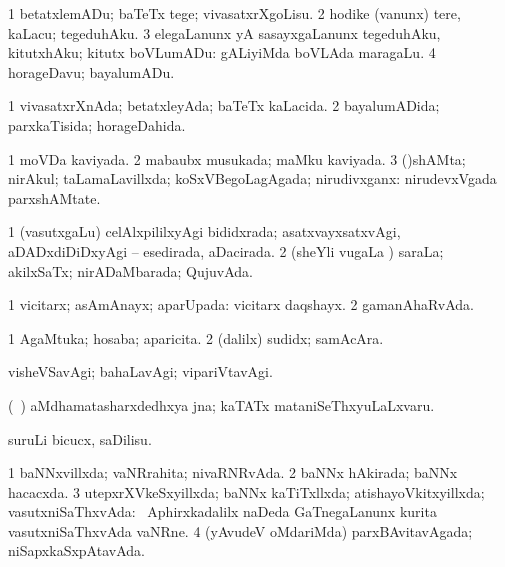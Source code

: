 {\bentry
{} 
\gl{\sakirx}
\expl{}
\bmng
\bnum
\num{1} betatxlemADu; baTeTx tege; vivasatxrXgoLisu. 
\num{2} hodike (\mo vanunx) tere, kaLacu; tegeduhAku. 
\num{3} elegaLanunx yA sasayxgaLanunx tegeduhAku, kitutxhAku; kitutx boVLumADu:  gALiyiMda boVLAda maragaLu. 
\num{4} horageDavu; bayalumADu. 
\enum
\emng
\eentry

\bentry
{} 
\gl{\gu}
\expl{}
\bmng
\bnum
\num{1} vivasatxrXnAda; betatxleyAda; baTeTx kaLacida. 
\num{2} bayalumADida; parxkaTisida; horageDahida. 
\enum
\emng
\eentry

\bentry
{} 
\gl{\gu}
\expl{}
\bmng
\bnum
\num{1} moVDa kaviyada. 
\num{2} mabaubx musukada; maMku kaviyada. 
\num{3} (\parx)shAMta; nirAkul; taLamaLavillxda; koSxVBegoLagAgada; nirudivxganx:  nirudevxVgada parxshAMtate. 
\enum
\emng
\eentry

\bentry
{} 
\gl{\gu}
\expl{}
\bmng
\bnum
\num{1} (vasutxgaLu) celAlxpililxyAgi bididxrada; asatxvayxsatxvAgi, aDADxdiDiDxyAgi -- esedirada, aDacirada. 
\num{2} (sheYli \mo vugaLa \vi) saraLa; akilxSaTx; nirADaMbarada; QujuvAda. 
\enum
\emng
\eentry

\bentry
{} 
\gl{\gu}
\expl{}
\bmng
\bnum
\num{1} vicitarx; asAmAnayx; aparUpada:  vicitarx daqshayx. 
\num{2} gamanAhaRvAda. 
\enum
\emng
\eentry

\bentry
{} 
\gl{\nA}
\expl{}
\bmng
\bnum
\num{1} AgaMtuka; hosaba; aparicita. 
\num{2} (\bava dalilx) sudidx; samAcAra. 
\enum
\emng
\eentry

\bentry
{} 
\gl{\kirxvi}
\expl{}
\bmng
visheVSavAgi; bahaLavAgi; vipariVtavAgi. 
\emng

\noindent 
\gl{\pagu}
\expl{}
\bmng
{} (\kanmu\ \hiV) aMdhamatasharxdedhxya jna; kaTATx mataniSeThxyuLaLxvaru. 
\emng
\eentry

\bentry
{} 
\gl{\sakirx}
\expl{}
\bmng
suruLi bicucx, saDilisu. 
\emng
\eentry

\bentry
{} 
\gl{\gu}
\expl{(\ame) }
\bmng
{} 
\emng
\eentry

\bentry
{} 
\gl{\gu}
\expl{}
\bmng
\bnum
\num{1} baNNxvillxda; vaNRrahita; nivaRNRvAda. 
\num{2} baNNx hAkirada; baNNx hacacxda. 
\num{3} utepxrXVkeSxyillxda; baNNx kaTiTxllxda; atishayoVkitxyillxda; vasutxniSaThxvAda:  \da\ Aphirxkadalilx naDeda GaTnegaLanunx kurita vasutxniSaThxvAda vaNRne. 
\num{4} (yAvudeV oMdariMda) parxBAvitavAgada; niSapxkaSxpAtavAda. 
\enum
\emng
\eentry

}
